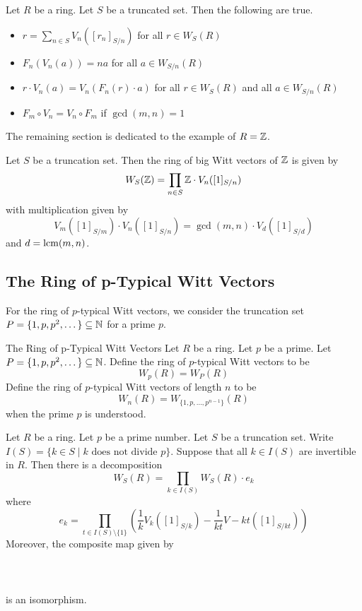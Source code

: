 \documentclass[a4paper]{article}
\begin{document}
\begin{prp}{}{} Let $R$ be a ring. Let $S$ be a truncated set. Then the following are true. 
\begin{itemize}
\item $r=\sum_{n\in S}V_n([r_n]_{S/n})$ for all $r\in W_S(R)$
\item $F_n(V_n(a))=na$ for all $a\in W_{S/n}(R)$
\item $r\cdot V_n(a)=V_n(F_n(r)\cdot a)$ for all $r\in W_S(R)$ and all $a\in W_{S/n}(R)$
\item $F_m\circ V_n=V_n\circ F_m$ if $\gcd(m,n)=1$
\end{itemize}
\end{prp}

The remaining section is dedicated to the example of $R=\mathbb{Z}$. 

\begin{prp}{}{} Let $S$ be a truncation set. Then the ring of big Witt vectors of $\mathbb{Z}$ is given by $$W_S(\mathbb{Z})=\prod_{n\in S}\mathbb{Z}\cdot V_n([1]_{S/n})$$ with multiplication given by $$V_m([1]_{S/m})\cdot V_n([1]_{S/n})=\gcd(m,n)\cdot V_d([1]_{S/d})$$ and $d=\operatorname{lcm}(m,n)$. 
\end{prp}

\subsection{The Ring of p-Typical Witt Vectors}
For the ring of $p$-typical Witt vectors, we consider the truncation set $P=\{1,p,p^2,\dots\}\subseteq\mathbb{N}$ for a prime $p$. 

\begin{defn}{The Ring of p-Typical Witt Vectors}{} Let $R$ be a ring. Let $p$ be a prime. Let $P=\{1,p,p^2,\dots\}\subseteq\mathbb{N}$. Define the ring of $p$-typical Witt vectors to be $$W_p(R)=W_P(R)$$ Define the ring of $p$-typical Witt vectors of length $n$ to be $$W_n(R)=W_{\{1,p,\dots,p^{n-1}\}}(R)$$ when the prime $p$ is understood. 
\end{defn}

\begin{thm}{}{} Let $R$ be a ring. Let $p$ be a prime number. Let $S$ be a truncation set. Write $I(S)=\{k\in S\;|\;k\text{ does not divide }p\}$. Suppose that all $k\in I(S)$ are invertible in $R$. Then there is a decomposition $$W_S(R)=\prod_{k\in I(S)}W_S(R)\cdot e_k$$ where $$e_k=\prod_{t\in I(S)\setminus\{1\}}\left(\frac{1}{k}V_k([1]_{S/k})-\frac{1}{kt}V-{kt}([1]_{S/kt})\right)$$ Moreover, the composite map given by \\~\\
\\~\\
is an isomorphism. 
\end{thm}
\end{document}
